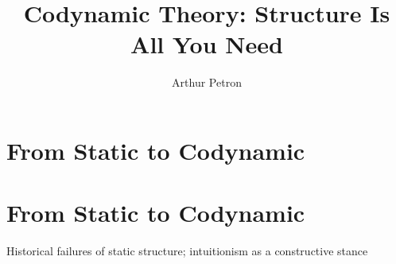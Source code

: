 \documentclass[11pt]{article}
\title{Codynamic Theory: Structure Is All You Need}
\author{Arthur Petron}
\begin{document}
\section*{From Static to Codynamic}

\section{From Static to Codynamic}

Historical failures of static structure; intuitionism as a constructive stance
\end{document}
